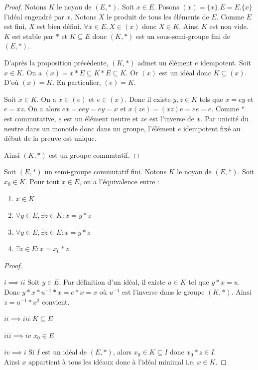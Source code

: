 \begin{proof}
Notons $K$ le noyau de $(E, *)$.
Soit $x \in E$.
Posons $(x) = \{x\}.E = E.\{x\}$ l'idéal engendré par $x$.
Notons $X$ le produit de tous les éléments de $E$.
Comme $E$ est fini, $X$ est bien défini.
$\forall x \in E, X \in (x)$ donc $X \in K$.
Ainsi $K$ est non vide.
$K$ est stable par $*$ et $K \subseteq E$ donc
$(K, *)$ est un sous-semi-groupe fini de $(E, *)$.

D'après la proposition précédente, $(K, *)$ admet un élément $e$ idempotent.
Soit $x \in K$.
On a $(x) = x * E \subseteq K * E \subseteq K$.
Or $(x)$ est un idéal donc $K \subseteq (x)$.
D'où $(x) = K$.
En particulier, $(e) = K$.

Soit $x \in K$.
On a $x \in (e)$ et $e \in (x)$.
Donc il existe $y, z \in K$ tels que $x = ey$ et $e = xz$.
On a alors $ex = eey = ey = x$ et $x(ze) = (xz)e = ee = e$.
Comme $*$ est commutative, $e$ est un élément neutre et $ze$ est l'inverse de $x$.
Par unicité du neutre dans un monoïde donc dans un groupe, l'élément $e$
idempotent fixé au début de la preuve est unique.

Ainsi $(K, *)$ est un groupe commutatif.
\end{proof}

\begin{proposition}
Soit $(E, *)$ un semi-groupe commutatif fini.
Notons $K$ le noyau de $(E, *)$.
Soit $x_0 \in K$.
Pour tout $x \in E$, on a l'équivalence entre :
\begin{enumerate}[label=\roman*)]
    \item $x \in K$
    \item $\forall y \in E, \exists z \in K : x = y * z$
    \item $\forall y \in E, \exists z \in E : x = y * z$
    \item $\exists z \in E : x = x_0 * z$
\end{enumerate}
\end{proposition}

\begin{proof} ~\par
$i \implies ii$ Soit $y \in E$.
Par définition d'un idéal, il existe $u \in K$ tel que $y * x = u$.
Donc $y * x * u^{-1} * x = e * x = x$ où $u^{-1}$ est l'inverse dans le groupe $(K, *)$.
Ainsi $z = u^{-1} * x^2$ convient.

$ii \implies iii$ $K \subseteq E$

$iii \implies iv$ $x_0 \in E$

$iv \implies i$ Si $I$ est un idéal de $(E, *)$, alors
$x_0 \in K \subseteq I$ donc $x_0 * z \in I$. \\
Ainsi $x$ appartient à tous les idéaux donc à l'idéal minimal i.e. $x \in K$.
\end{proof}


